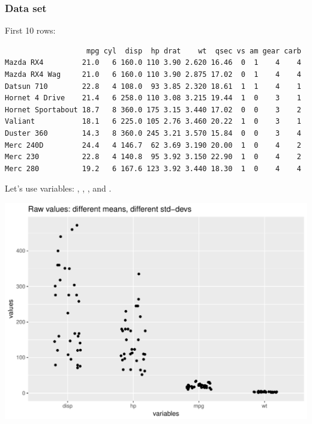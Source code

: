 \documentclass[12pt]{beamer}\usepackage[]{graphicx}\usepackage[]{color}
\makeatletter
\def\maxwidth{ %
  \ifdim\Gin@nat@width>\linewidth
    \linewidth
  \else
    \Gin@nat@width
  \fi
}
\newenvironment{kframe}{%
 \def\at@end@of@kframe{}%
 \ifinner\ifhmode%
  \def\at@end@of@kframe{\end{minipage}}%
  \begin{minipage}{\columnwidth}%
 \fi\fi%
 \def\FrameCommand##1{\hskip\@totalleftmargin \hskip-\fboxsep
 \colorbox{shadecolor}{##1}\hskip-\fboxsep
     \hskip-\linewidth \hskip-\@totalleftmargin \hskip\columnwidth}%
 \MakeFramed {\advance\hsize-\width
   \@totalleftmargin\z@ \linewidth\hsize
   \@setminipage}}%
 {\par\unskip\endMakeFramed%
 \at@end@of@kframe}
\newenvironment{knitrout}{}{} %
\makeatother
\begin{document}
\begin{frame}[fragile]
\frametitle{Data set }

First 10 rows:
\begin{knitrout}\scriptsize
{}\color{fgcolor}\begin{kframe}
\begin{verbatim}
                   mpg cyl  disp  hp drat    wt  qsec vs am gear carb
Mazda RX4         21.0   6 160.0 110 3.90 2.620 16.46  0  1    4    4
Mazda RX4 Wag     21.0   6 160.0 110 3.90 2.875 17.02  0  1    4    4
Datsun 710        22.8   4 108.0  93 3.85 2.320 18.61  1  1    4    1
Hornet 4 Drive    21.4   6 258.0 110 3.08 3.215 19.44  1  0    3    1
Hornet Sportabout 18.7   8 360.0 175 3.15 3.440 17.02  0  0    3    2
Valiant           18.1   6 225.0 105 2.76 3.460 20.22  1  0    3    1
Duster 360        14.3   8 360.0 245 3.21 3.570 15.84  0  0    3    4
Merc 240D         24.4   4 146.7  62 3.69 3.190 20.00  1  0    4    2
Merc 230          22.8   4 140.8  95 3.92 3.150 22.90  1  0    4    2
Merc 280          19.2   6 167.6 123 3.92 3.440 18.30  1  0    4    4
\end{verbatim}
\end{kframe}
\end{knitrout}

Let's use variables: , , , and .

\end{frame}


\begin{frame}[fragile]



\begin{knitrout}\footnotesize
{}\color{fgcolor}

{\centering \includegraphics[width=\maxwidth]{figure/unnamed-chunk-2-1} 

}



\end{knitrout}

\end{frame}
\end{document}
